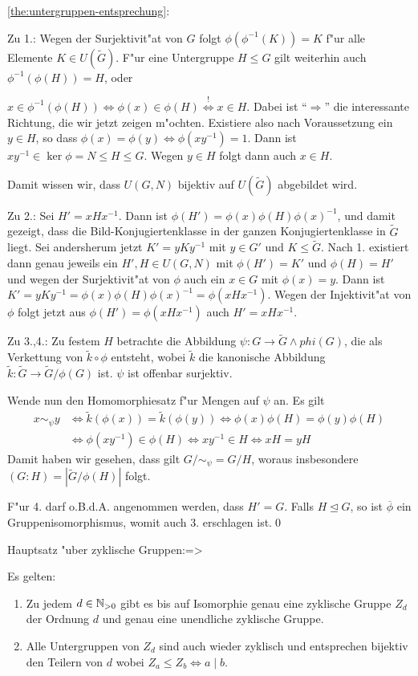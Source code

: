 \proof \ref{the:untergruppen-entsprechung}:{
  Zu 1.: Wegen der Surjektivit"at von $G$ folgt $\phi(\phi^{-1}(K))=K$ f"ur alle
  Elemente $K\in U(\tilde G)$. F"ur eine Untergruppe $H\leq G$ gilt weiterhin
  auch $\phi^{-1}(\phi(H))=H$, oder
  
  $x\in\phi^{-1}(\phi(H))\iff \phi(x)\in \phi(H)\overset !\iff x\in H$. Dabei ist ``$\Rightarrow$'' die 
  interessante Richtung, die wir jetzt zeigen m"ochten. Existiere also
  nach Voraussetzung ein $y\in H$, so dass $\phi(x)=\phi(y)\iff \phi(xy^{-1})=1$.
  Dann ist $xy^{-1}\in\ker \phi=N\leq  H\leq G$. Wegen $y\in H$ folgt dann auch
  $x\in H$.
  
  Damit wissen wir, dass $U(G,N)$ bijektiv auf $U(\tilde G)$ abgebildet 
  wird.
  
  Zu 2.: Sei $H'=xHx^{-1}$. Dann ist $\phi(H')=\phi(x)\phi(H)\phi(x)^{-1}$, und damit
  gezeigt, dass die Bild-Konjugiertenklasse in der ganzen 
  Konjugiertenklasse in $\tilde G$ liegt. 
  Sei andersherum jetzt $K'=yKy^{-1}$ mit $y\in G'$ und $K\leq \tilde G$.
  Nach 1. existiert dann genau jeweils ein $H',H\in U(G,N)$ mit
  $\phi(H')=K'$ und $\phi(H)=H'$ und wegen der Surjektivit"at von $\phi$
  auch ein $x\in G$ mit $\phi(x)=y$. Dann ist
  $K'=yKy^{-1}=\phi(x)\phi(H)\phi(x)^{-1}=\phi(xHx^{-1})$.
  Wegen der Injektivit"at von $\phi$ folgt jetzt aus $\phi(H')=\phi(xHx^{-1})$ auch
  $H'=xHx^{-1}$.
  
  Zu 3.,4.: Zu festem $H$ betrachte die Abbildung $\psi:G\to\tilde G\land phi(G)$, die
  als Verkettung von $\tilde k\circ \phi$ entsteht, wobei $\tilde k$ die kanonische Abbildung
  $\tilde k:\tilde G\to \tilde G/ \phi(G)$ ist.
  $\psi$ ist offenbar surjektiv.
  
  Wende nun den Homomorphiesatz f"ur Mengen auf $\psi$ an.
  Es gilt 
  \begin{align*}
    x\sim_\psi y 
    &\iff \tilde k(\phi(x))=\tilde k(\phi(y))
    \iff \phi(x)\phi(H)=\phi(y)\phi(H)\\
    &\iff \phi(xy^{-1})\in\phi(H)
    \iff xy^{-1}\in H
    \iff xH=yH
    \end{align*}
  Damit haben wir gesehen, dass gilt $G/ \sim_\psi =G/H$, woraus insbesondere
  $(G:H)=|\tilde G/ \phi(H)|$ folgt. 
  
  F"ur 4. darf o.B.d.A. angenommen werden,
  dass $H'=G$. Falls $H\unlhd G$, so ist $\overline \phi$ ein Gruppenisomorphismus,
  womit auch 3. erschlagen ist.\qed
  }
\theorem Hauptsatz "uber zyklische Gruppen:=>{
  \label{the:zyklische-gruppen-hauptsatz}
  Es gelten:
  \begin{enumerate}
    \item Zu jedem $d\in\mathbb N_{>0}$ gibt es bis auf Isomorphie genau eine 
      zyklische Gruppe $Z_d$ der Ordnung $d$ und genau eine unendliche
      zyklische Gruppe.
    \item Alle Untergruppen von $Z_d$ sind auch wieder zyklisch und entsprechen
      bijektiv den Teilern von $d$ wobei $Z_a \leq Z_b \iff a\mid b$.
    \end{enumerate}
  }
